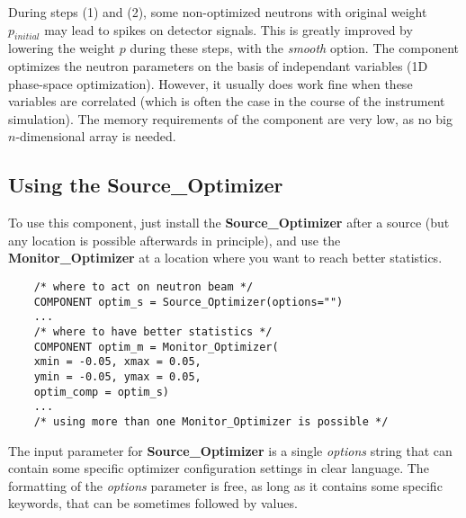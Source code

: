 During steps (1) and (2), some non-optimized neutrons with original
weight $p_{initial}$ may lead to spikes on detector signals. This is
greatly improved by lowering the weight $p$ during these steps, with the
\textit{smooth} option.
The component optimizes the neutron parameters on the basis of
independant variables (1D phase-space optimization). However, it usually does work fine when these
variables are correlated (which is often the case in the course of the
instrument simulation).
The memory requirements of the component are very low, as no big
$n$-dimensional array is needed.

\subsection{Using the Source\_Optimizer}

To use this component, just install the \textbf{Source\_Optimizer} after a
source (but any location is possible afterwards in principle), and use the \textbf{Monitor\_Optimizer} at a location where you want to reach better
statistics.

\begin{lstlisting}
    /* where to act on neutron beam */
    COMPONENT optim_s = Source_Optimizer(options="")
    ...
    /* where to have better statistics */
    COMPONENT optim_m = Monitor_Optimizer(
    xmin = -0.05, xmax = 0.05,
    ymin = -0.05, ymax = 0.05,
    optim_comp = optim_s)
    ...
    /* using more than one Monitor_Optimizer is possible */
\end{lstlisting}

The input parameter for \textbf{Source\_Optimizer} is a single \textit{
  options} string that can contain some specific optimizer configuration
settings in clear language. The formatting of the \textit{options}
parameter is free, as long as it contains some specific keywords, that
can be sometimes followed by values.

